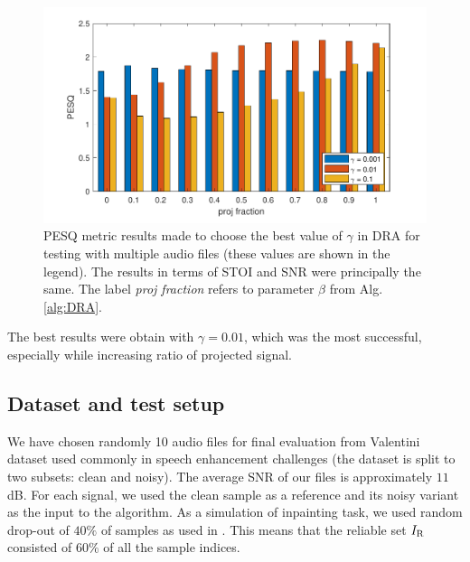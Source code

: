 \documentclass[conference]{IEEEtran}
\newcommand{\todo}[1]{\textcolor{red}{#1}}
\begin{document}
\begin{figure}[h]
	\includegraphics[width=1\linewidth]{figures/gamma_test}
	\caption{PESQ metric results made to choose the best value of $\gamma$ in DRA for testing with multiple audio files (these values are shown in the legend). %
	The results in terms of STOI and SNR were principally the same.
	The label \textit{proj fraction} refers to parameter $\beta$ from Alg.\,\ref{alg:DRA}.}
	\label{fig:gammatest}
\end{figure}

The best results were obtain with $\gamma=0.01$, which was the most successful, especially while increasing ratio of projected signal.

\subsection{Dataset and test setup}
We have chosen randomly 10 audio files for final evaluation from Valentini dataset \cite{ValentiniBotinhao2017} used commonly in speech enhancement challenges (the dataset is split to two subsets: clean and noisy).
The average SNR of our files is approximately $11$ dB.
For each signal, we used the clean sample as a reference and its noisy variant as the input to the algorithm. %
As a simulation of inpainting task, we used random drop-out of %
$40\%$ of samples as used in \cite{Mokry2021}.
This means that the reliable set $I_\textup{R}$ consisted of $60\%$ of all the sample indices.
\end{document}
